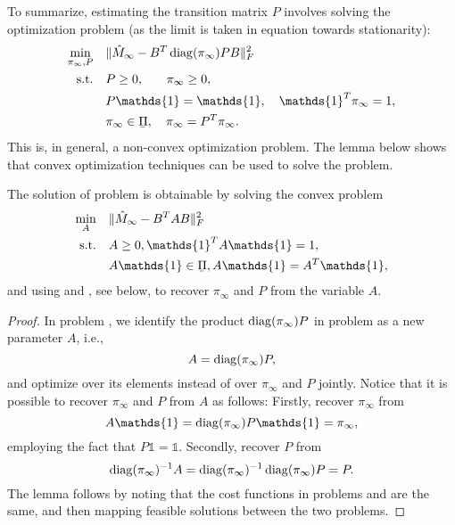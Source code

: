 \documentclass[journal]{IEEEtran}
\newcommand{\polylb}{\underaccent{\bar}{\Pi}}
\newcommand{\pii}{\pi_\infty}
\begin{document}
To summarize, estimating the transition matrix $P$ involves solving the optimization
problem (as the limit is taken in equation  towards stationarity):
\begin{align}
    \min_{\pi_\infty, P} & \quad \|\hat M_\infty - B^T \diag{\pi_\infty} PB \|_F^2 \notag \\
    \text{s.t.} & \quad P \geq 0, \;\;\; \quad \pii \geq 0, \notag \\
                & \quad P \mathds{1} = \mathds{1}, \quad \mathds{1}^T \pi_\infty = 1, \notag \\
                & \quad \pi_\infty \in \polylb, \quad \pi_\infty = P^T \pi_\infty.
    \label{eq:nl_matching} %
\end{align}
This is, in general, a non-convex optimization problem. The lemma below shows
that convex optimization techniques can be used to solve the problem.

\begin{lemma}
    The solution of problem  is obtainable by solving the convex
    problem
    \begin{align}
        \min_A \quad & \|\hat M_\infty - B^T A B\|_F^2 \notag \\
        \text{s.t.} \quad & A \geq 0, \mathds{1}^T A \mathds{1} = 1, \notag \\
                          & A \mathds{1} \in \underaccent{\bar}{\Pi},
        A\mathds{1} = A^T \mathds{1},
        \label{eq:convex_mom}
    \end{align}
    and using  and , see below, to recover
    $\pi_\infty$ and $P$ from the variable $A$.
    \label{thrm:convex_equivalence}
\end{lemma}
\begin{proof}
In problem , we identify the product $\diag{\pii} P$ in
problem  as a new parameter $A$, i.e.,
\begin{equation}
    A = \diag{\pii} P,
    \label{eq:definition_A}
\end{equation}
and optimize over its elements instead of over $\pii$ and $P$ jointly.  Notice
that it is possible to recover $\pii$ and $P$ from $A$ as follows: Firstly,
recover $\pii$ from
\begin{equation}
    A \mathds{1} = \diag{\pii} P \mathds{1} = \pii,
    \label{eq:recover_pi}
\end{equation}
employing the fact that $P \mathds{1} = \mathds{1}$.
Secondly, recover $P$ from
\begin{equation}
    \diag{\pii}^{-1} A = \diag{\pii}^{-1} \diag{\pii} P = P.
    \label{eq:recover_P}
\end{equation}
The lemma follows by noting that the cost functions in problems
 and  are the same, and then mapping
feasible solutions between the two problems.
\end{proof}
\end{document}
